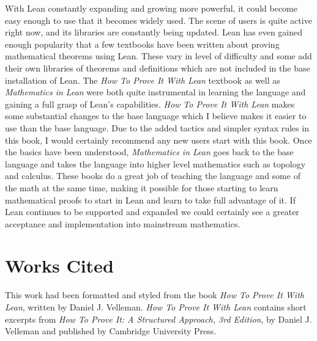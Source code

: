 \documentclass[
  letterpaper,
]{scrreprt}
\theoremstyle{remark}
\begin{document}
With Lean constantly expanding and growing more powerful, it could
become easy enough to use that it becomes widely used. The scene of
users is quite active right now, and its libraries are constantly being
updated. Lean has even gained enough popularity that a few textbooks
have been written about proving mathematical theorems using Lean. These
vary in level of difficulty and some add their own libraries of theorems
and definitions which are not included in the base installation of Lean.
The \emph{How To Prove It With Lean} textbook as well as
\emph{Mathematics in Lean} were both quite instrumental in learning the
language and gaining a full grasp of Lean's capabilities. \emph{How To
Prove It With Lean} makes some substantial changes to the base language
which I believe makes it easier to use than the base language. Due to
the added tactics and simpler syntax rules in this book, I would
certainly recommend any new users start with this book. Once the basics
have been understood, \emph{Mathematics in Lean} goes back to the base
language and takes the language into higher level mathematics such as
topology and calculus. These books do a great job of teaching the
language and some of the math at the same time, making it possible for
those starting to learn mathematical proofs to start in Lean and learn
to take full advantage of it. If Lean continues to be supported and
expanded we could certainly see a greater acceptance and implementation
into mainstream mathematics.


\hypertarget{works-cited}{%
\chapter*{Works Cited}\label{works-cited}}


This work had been formatted and styled from the book \emph{How To Prove
It With Lean}, written by Daniel J. Velleman. \emph{How To Prove It With
Lean} contains short excerpts from \emph{How To Prove It: A Structured
Approach, 3rd Edition}, by Daniel J. Velleman and published by Cambridge
University Press.

\hfill\break
\end{document}
